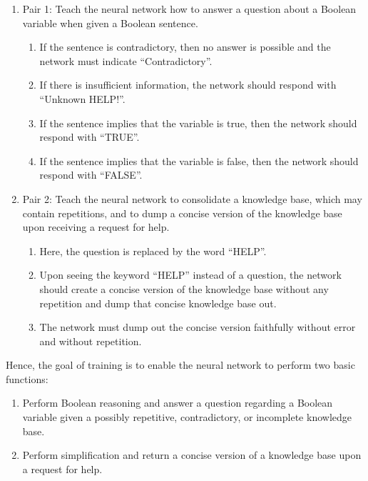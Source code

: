 \documentclass[
]{article}
\begin{document}
\begin{enumerate}
\def\labelenumi{\arabic{enumi}.}
\item
  Pair 1: Teach the neural network how to answer a question about a
  Boolean variable when given a Boolean sentence.

  \begin{enumerate}
  \def\labelenumii{\alph{enumii}.}
  \item
    If the sentence is contradictory, then no answer is possible and the
    network must indicate ``Contradictory''.
  \item
    If there is insufficient information, the network should respond
    with ``Unknown HELP!''.
  \item
    If the sentence implies that the variable is true, then the network
    should respond with ``TRUE''.
  \item
    If the sentence implies that the variable is false, then the network
    should respond with ``FALSE''.
  \end{enumerate}
\item
  Pair 2: Teach the neural network to consolidate a knowledge base,
  which may contain repetitions, and to dump a concise version of the
  knowledge base upon receiving a request for help.

  \begin{enumerate}
  \def\labelenumii{\alph{enumii}.}
  \item
    Here, the question is replaced by the word ``HELP''.
  \item
    Upon seeing the keyword ``HELP'' instead of a question, the network
    should create a concise version of the knowledge base without any
    repetition and dump that concise knowledge base out.
  \item
    The network must dump out the concise version faithfully without
    error and without repetition.
  \end{enumerate}
\end{enumerate}

Hence, the goal of training is to enable the neural network to perform
two basic functions:

\begin{enumerate}
\def\labelenumi{\arabic{enumi}.}
\item
  Perform Boolean reasoning and answer a question regarding a Boolean
  variable given a possibly repetitive, contradictory, or incomplete
  knowledge base.
\item
  Perform simplification and return a concise version of a knowledge
  base upon a request for help.
\end{enumerate}
\end{document}
